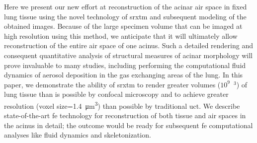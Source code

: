 Here we present our new effort at \threed reconstruction of the acinar air space in fixed lung tissue using the novel technology of \ac{srxtm} and subsequent \threed modeling of the obtained images. Because of the large specimen volume that can be imaged at high resolution using this method, we anticipate that it will ultimately allow \threed reconstruction of the entire air space of one acinus. Such a detailed rendering and consequent \threed quantitative analysis of structural measures of acinar morphology will prove invaluable to many studies, including performing the computational fluid dynamics of aerosol deposition in the gas exchanging areas of the lung. In this paper, we demonstrate the ability of \ac{srxtm} to render greater volumes ($10^9$~\micro\meter$^3$) of lung tissue than is possible by confocal microscopy and to achieve greater resolution (voxel size=\SI{1.4}{\micro\meter\cubed}) than possible by traditional \ac{uct}. We describe state-of-the-art \acf{fe} technology for \threed reconstruction of both tissue and air spaces in the acinus in detail; the outcome would be ready for subsequent \ac{fe} computational analyses like fluid dynamics and skeletonization.

